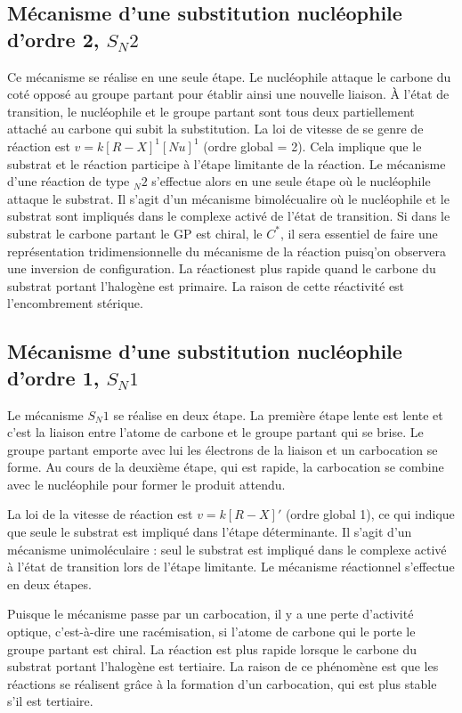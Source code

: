 \subsection{Mécanisme d'une substitution nucléophile d'ordre 2, $S_N2$}
Ce mécanisme se réalise en une seule étape.
Le nucléophile attaque le carbone du coté opposé au groupe partant pour établir ainsi une nouvelle liaison.
\`A l'état de transition, le nucléophile et le groupe partant sont tous deux partiellement attaché au carbone qui subit la substitution.
La loi de vitesse de se genre de réaction est $v = k[R-X]^1[Nu]^1$ (ordre global = 2).
Cela implique que le substrat et le réaction participe à l'étape limitante de la réaction.
Le mécanisme d'une réaction de type $_N2$ s'effectue alors en une seule étape où le nucléophile attaque le substrat.
Il s'agit d'un mécanisme bimolécualire où le nucléophile et le substrat sont impliqués dans le complexe activé de l'état de transition.
Si dans le substrat le carbone partant le GP est chiral, le $C^*$, il sera essentiel de faire une représentation tridimensionnelle du mécanisme de la réaction puisq'on observera une inversion de configuration.
La réactionest plus rapide quand le carbone du substrat portant l'halogène est primaire.
La raison de cette réactivité est l'encombrement stérique.

\subsection{Mécanisme d'une substitution nucléophile d'ordre 1, $S_N1$}
Le mécanisme $S_N1$ se réalise en deux étape.
La première étape lente est lente et c'est la liaison entre l'atome de carbone et le groupe partant qui se brise.
Le groupe partant emporte avec lui les électrons de la liaison et un carbocation se forme.
Au cours de la deuxième étape, qui est rapide, la carbocation se combine avec le nucléophile pour former le produit attendu.

La loi de la vitesse de réaction est $ v = k[R-X]'$ (ordre global 1), ce qui indique que seule le substrat est impliqué dans l'étape déterminante.
Il s'agit d'un mécanisme unimoléculaire : seul le substrat est impliqué dans le complexe activé à  l'état de transition lors de l'étape limitante.
Le mécanisme réactionnel s'effectue en deux étapes.

Puisque le mécanisme passe par un carbocation, il y a une perte d'activité optique, c'est-à-dire une racémisation, si l'atome de carbone qui le porte le groupe partant est chiral.
La réaction est plus rapide lorsque le carbone du substrat portant l'halogène est tertiaire.
La raison de ce phénomène est que les réactions se réalisent grâce à la formation d'un carbocation, qui est plus stable s'il est tertiaire.

